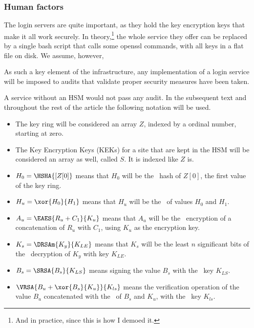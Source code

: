 \subsubsection{Human factors}
The login servers are quite important,
as they hold the key encryption keys that make it all work securely.
In theory,\footnote{And in practice, since this is how I demoed it.}
the whole service they offer can be replaced by a single bash script that calls some openssl commands,
with all keys in a flat file on disk.
We assume,
however,
\begin{moafu}
As such a key element of the infrastructure,
any implementation of a login service will be imposed to audits that validate proper security measures have been taken.
\end{moafu}
A service without an HSM would not pass any audit.
In the subsequent text and throughout the rest of the article the following notation will be used.
\begin{itemize}
\item The key ring will be considered an array $Z$, indexed by a ordinal number, starting at zero.
\item The Key Encryption Keys (KEKs) for a site that are kept in the HSM will be considered an array as well, called $S$.
It is indexed like $Z$ is.
\item \(H_0=\HSHA{[Z[0]}\) means that $H_0$ will be the \SHA\ hash of $Z[0]$, the first value of the key ring.
\item \(H_u=\xor{H_0}{H_1}\) means that $H_u$ will be the \XOR\ of values $H_0$ and $H_1$.
\item \(A_u=\EAES{R_u + C_1}{K_u}\) means that $A_u$ will be the \AES\ encryption of a concatenation of $R_u$ with $C_1$, using $K_u$ as the encryption key.
\item \(K_s=\DRSAm{K_y}{K_{LE}}\) means that $K_s$ will be the least $n$ significant bits of the \RSA\ decryption of $K_y$ with key $K_{LE}$.
\item \(B_s=\SRSA{B_s}{K_{LS}}\) means signing the value $B_s$ with the \RSA\ key $K_{LS}$.
\item \(\VRSA{B_u+\xor{B_s}{K_u}}{K_{ls}}\) means the verification operation of the value $B_u$ concatenated with the \XOR\ of $B_s$ and $K_u$, with the \RSA\ key $K_{ls}$.
\end{itemize}
